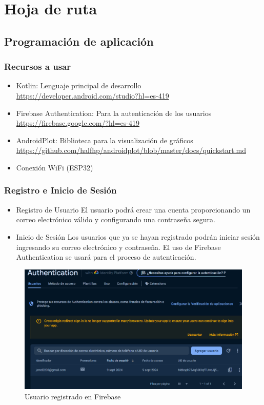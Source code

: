 \documentclass[../main]{subfiles}
\begin{document}
\section{Hoja de ruta}

\subsection{Programación de aplicación}

\subsubsection{Recursos a usar}

\begin{itemize}
	\item Kotlin: Lenguaje principal de desarrollo
	      \url{https://developer.android.com/studio?hl=es-419}
	\item Firebase Authentication: Para la autenticación de los usuarios
	      \url{https://firebase.google.com/?hl=es-419}
	\item AndroidPlot: Biblioteca para la visualización de gráficos
	      \url{https://github.com/halfhp/androidplot/blob/master/docs/quickstart.md }
	\item Conexión WiFi (ESP32)
\end{itemize}

\subsubsection{Registro e Inicio de Sesión}

\begin{itemize}
	\item Registro de Usuario
	      El usuario podrá crear una cuenta proporcionando un correo electrónico
	      válido y configurando una contraseña segura.
	\item Inicio de Sesión
	      Los usuarios que ya se hayan registrado podrán iniciar sesión ingresando
	      su correo electrónico y contraseña. El uso de Firebase Authentication
	      se usará para el proceso de autenticación.
\end{itemize}

\begin{figure}[H]
	\centering
	\includegraphics[width=15cm]{res/AutenticacionFireBase.png}
	\caption{Usuario registrado en Firebase}
	\label{FiguraDeAutenticacion}
\end{figure}
\end{document}
